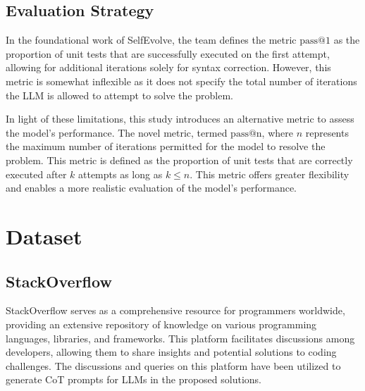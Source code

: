 \documentclass[a4paper,oneside]{book}
\begin{document}
\subsection{Evaluation Strategy}
In the foundational work of SelfEvolve, the team defines the metric $\text{pass@1}$ as the proportion of unit tests that are successfully executed on the first attempt, allowing for additional iterations solely for syntax correction. However, this metric is somewhat inflexible as it does not specify the total number of iterations the LLM is allowed to attempt to solve the problem.

In light of these limitations, this study introduces an alternative metric to assess the model's performance. The novel metric, termed $\text{pass@n}$, where $n$ represents the maximum number of iterations permitted for the model to resolve the problem. This metric is defined as the proportion of unit tests that are correctly executed after $k$ attempts as long as $k \leq n$. This metric offers greater flexibility and enables a more realistic evaluation of the model's performance.

\section{Dataset}
\subsection{}
\subsection{StackOverflow}
StackOverflow serves as a comprehensive resource for programmers worldwide, providing an extensive repository of knowledge on various programming languages, libraries, and frameworks. This platform facilitates discussions among developers, allowing them to share insights and potential solutions to coding challenges. The discussions and queries on this platform have been utilized to generate CoT prompts for LLMs in the proposed solutions.
\end{document}

